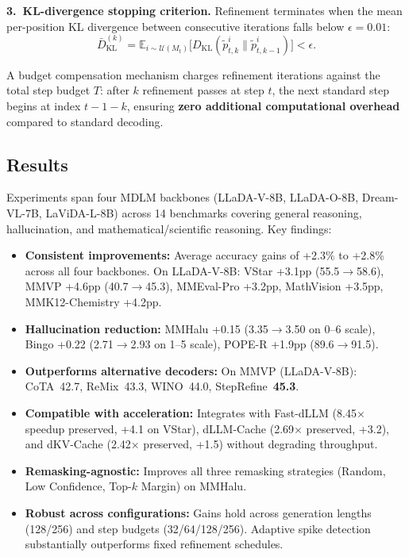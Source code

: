 \documentclass[11pt,a4paper]{article}
\begin{document}
\textbf{3.~KL-divergence stopping criterion.} Refinement terminates when the mean per-position KL divergence between consecutive iterations falls below $\epsilon{=}0.01$:
\[
  \bar{D}_{\mathrm{KL}}^{(k)} = \mathbb{E}_{i \sim \mathcal{U}(M_t)}\bigl[D_{\mathrm{KL}}(\tilde{p}_{t,k}^i \| \tilde{p}_{t,k-1}^i)\bigr] < \epsilon.
\]

A budget compensation mechanism charges refinement iterations against the total step budget $T$: after $k$ refinement passes at step $t$, the next standard step begins at index $t{-}1{-}k$, ensuring \textbf{zero additional computational overhead} compared to standard decoding.

\subsection{Results}
Experiments span four MDLM backbones (LLaDA-V-8B, LLaDA-O-8B, Dream-VL-7B, LaViDA-L-8B) across 14 benchmarks covering general reasoning, hallucination, and mathematical/scientific reasoning. Key findings:

\begin{itemize}
  \item \textbf{Consistent improvements:} Average accuracy gains of +2.3\% to +2.8\% across all four backbones. On LLaDA-V-8B: VStar +3.1pp (55.5$\to$58.6), MMVP +4.6pp (40.7$\to$45.3), MMEval-Pro +3.2pp, MathVision +3.5pp, MMK12-Chemistry +4.2pp.
  \item \textbf{Hallucination reduction:} MMHalu +0.15 (3.35$\to$3.50 on 0--6 scale), Bingo +0.22 (2.71$\to$2.93 on 1--5 scale), POPE-R +1.9pp (89.6$\to$91.5).
  \item \textbf{Outperforms alternative decoders:} On MMVP (LLaDA-V-8B): CoTA~42.7, ReMix~43.3, WINO~44.0, StepRefine~\textbf{45.3}.
  \item \textbf{Compatible with acceleration:} Integrates with Fast-dLLM (8.45$\times$ speedup preserved, +4.1 on VStar), dLLM-Cache (2.69$\times$ preserved, +3.2), and dKV-Cache (2.42$\times$ preserved, +1.5) without degrading throughput.
  \item \textbf{Remasking-agnostic:} Improves all three remasking strategies (Random, Low Confidence, Top-$k$ Margin) on MMHalu.
  \item \textbf{Robust across configurations:} Gains hold across generation lengths (128/256) and step budgets (32/64/128/256). Adaptive spike detection substantially outperforms fixed refinement schedules.
\end{itemize}
\end{document}
